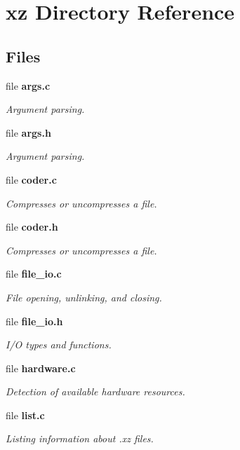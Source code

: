 \section{xz Directory Reference}
\label{dir_53e01eec41348db90f08d9ee7e6793af}
\subsection*{Files}
\begin{DoxyCompactItemize}
\item 
file \textbf{ args.\+c}
\begin{DoxyCompactList}\small\item\em Argument parsing. \end{DoxyCompactList}\item 
file \textbf{ args.\+h}
\begin{DoxyCompactList}\small\item\em Argument parsing. \end{DoxyCompactList}\item 
file \textbf{ coder.\+c}
\begin{DoxyCompactList}\small\item\em Compresses or uncompresses a file. \end{DoxyCompactList}\item 
file \textbf{ coder.\+h}
\begin{DoxyCompactList}\small\item\em Compresses or uncompresses a file. \end{DoxyCompactList}\item 
file \textbf{ file\+\_\+io.\+c}
\begin{DoxyCompactList}\small\item\em File opening, unlinking, and closing. \end{DoxyCompactList}\item 
file \textbf{ file\+\_\+io.\+h}
\begin{DoxyCompactList}\small\item\em I/O types and functions. \end{DoxyCompactList}\item 
file \textbf{ hardware.\+c}
\begin{DoxyCompactList}\small\item\em Detection of available hardware resources. \end{DoxyCompactList}\item 
file \textbf{ list.\+c}
\begin{DoxyCompactList}\small\item\em Listing information about .xz files. \end{DoxyCompactList}\item 

\end{DoxyCompactItemize}
